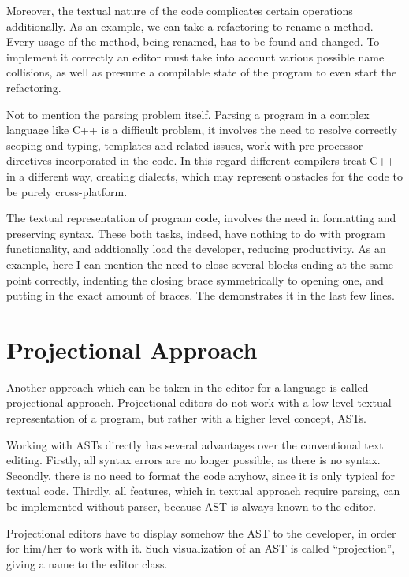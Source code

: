 Moreover, the textual nature of the code complicates certain operations additionally. As an example, we can take a refactoring
to rename a method. Every usage of the method, being renamed, has to be found and changed. To implement it correctly an editor
must take into account various possible name collisions, as well as presume a compilable state of the program to even start
the refactoring.

Not to mention the parsing problem itself. Parsing a program in a complex language like C++ is a difficult problem, it involves 
the need to resolve correctly scoping and typing, templates and related issues, work with pre-processor directives incorporated
in the code. In this regard different compilers treat C++ in a different way, creating dialects, which may represent obstacles for
the code to be purely cross-platform.


The textual representation of program code, involves the need in formatting and preserving syntax. These both tasks, indeed,  
have nothing to do with program functionality, and addtionally load the developer, reducing productivity. As an example, here
I can mention the need to close several blocks ending at the same point correctly, indenting the closing brace symmetrically 
to opening one, and putting in the exact amount of braces. The  demonstrates it in the last few lines.

\section{Projectional Approach}

Another approach which can be taken in the editor for a language is called projectional approach. Projectional editors
do not work with a low-level textual representation of a program, but rather with a higher level concept, ASTs.

Working with ASTs directly has several advantages over the conventional text editing. Firstly, all syntax errors are no longer
possible, as there is no syntax. Secondly, there is no need to format the code anyhow, since it is only typical for textual code.
Thirdly, all features, which in textual approach require parsing, can be implemented without parser, because AST is always known to the editor.

Projectional editors have to display somehow the AST to the developer, in order for him/her to work with it. Such visualization
of an AST is called ``projection'', giving a name to the editor class.

